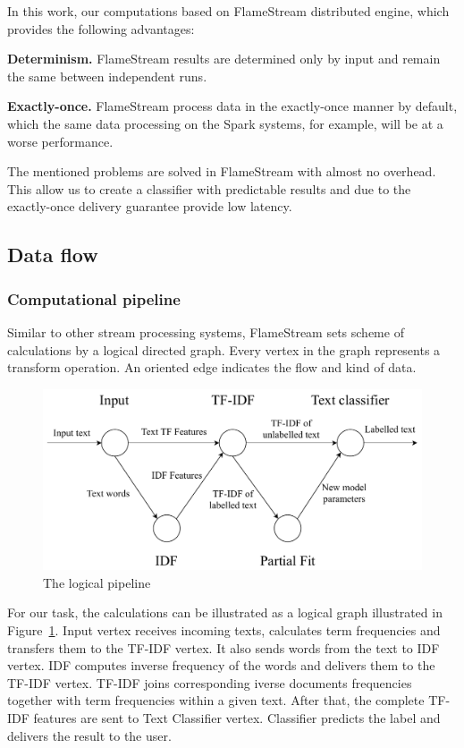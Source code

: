 In this work, our computations based on FlameStream \cite{kuralenok2018flamestream} distributed engine, which provides the following advantages:

\textbf{Determinism.} FlameStream results are determined only by input and remain the same between independent runs.

\textbf{Exactly-once.} FlameStream process data in the exactly-once manner by default, which the same data processing on the Spark systems, for example, will be at a worse performance.

The mentioned problems are solved in FlameStream with almost no overhead. This allow us to create a classifier with predictable results and due to the exactly-once delivery guarantee provide low latency.

\subsection{Data flow \label{DF}}

\subsubsection{Computational pipeline}

Similar to other stream processing systems, FlameStream sets scheme of calculations by a logical directed graph. Every vertex in the graph represents a transform operation. An oriented edge indicates the flow and kind of data.

\begin{figure}[htbp]
  \centering
  \includegraphics[scale=0.48]{pics/logical-graph}
  \caption{The logical pipeline}
  \label {logical_graph}
\end{figure}

For our task, the calculations can be illustrated as a logical graph illustrated in Figure~\ref{logical_graph}. Input vertex receives incoming texts, calculates term frequencies and transfers them to the TF-IDF vertex. It also sends words from the text to IDF vertex. IDF computes inverse frequency of the words and delivers them to the TF-IDF vertex. TF-IDF joins corresponding iverse documents frequencies together with term frequencies within a given text. After that, the complete TF-IDF features are sent to Text Classifier vertex. Classifier predicts the label and delivers the result to the user.

